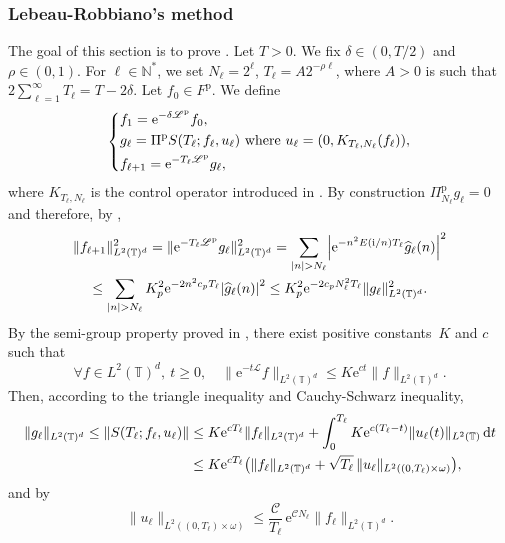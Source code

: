 \documentclass[10pt]{amsart}
\let\mathcal\mathscr
\theoremstyle{plain}
\theoremstyle{definition}
\theoremstyle{remark}
\newcommand{\diff}[1][-3]{\ensuremath{\mathop{}\mkern#1mu\mathrm{d}}}
\newcommand{\set}{\mathbb}
\newcommand{\T}{\set{T}}
\newcommand{\p}{{\mathrm p}}
\newcommand{\eu}{\mathrm e}
\newcommand{\iu}{\mathrm i}
\let\originalleft\left
\let\originalright\right
\renewcommand{\left}{\mathopen{}\mathclose\bgroup\originalleft}
\renewcommand{\right}{\aftergroup\egroup\originalright}
\newcommand{\ssqrt}[1]{\sqrt{\smash[b]{#1}}}
\begin{document}
\subsubsection{Lebeau-Robbiano's method} \label{Subsec:LR}

The goal of this section is to prove . Let $T>0$.
We fix $\delta \in (0,T/2)$ and $\rho \in (0,1)$.
For $\ell \in \set N^*$, we set $N_\ell=2^\ell$, $T_{\ell}=A2^{-\rho \ell}$, where $A>0$ is such that $2\sum_{\ell=1}^\infty T_\ell = T - 2\delta$.
Let $f_0 \in F^\p$. We define
\[
\left\lbrace\begin{aligned}
& f_1=\eu^{-\delta \mathcal{L}^\p} f_0, \\
& g_\ell = \Pi^\p S(T_\ell ; f_\ell, u_\ell) \text{ where } u_\ell = \left(0,K_{T_\ell,N_\ell}(f_\ell)\right), \\
& f_{\ell+1}=\eu^{-T_\ell \mathcal{L}^\p} g_\ell,
\end{aligned}\right.
\]
where $K_{T_\ell,N_\ell}$ is the control operator introduced in . By construction $\Pi^\p_{N_\ell} g_\ell=0$ and therefore, by ,
\begin{multline*}
\|f_{\ell+1}\|_{L^2(\T)^d}^2 = \| \eu^{-T_\ell \mathcal{L}^\p} g_\ell \|_{L^2(\T)^d}^2
= \sum_{|n|>N_\ell} \left\lvert \eu^{-n^2 E(\iu/n)T_\ell} \widehat{g}_\ell(n) \right\rvert^2 \\
\leq \sum_{|n|>N_\ell} K_p^2 \eu^{-2 n^2 c_p T_\ell} \left\lvert \widehat{g}_\ell(n) \right\rvert^2
\leq K_p^2 \eu^{-2 c_p N_\ell^2 T_\ell} \|g_\ell\|_{L^2(\T)^d}^2.
\end{multline*}
By the semi-group property proved in , there exist positive constants~$K$ and $c$ such that
\[
\forall f \in L^2(\T)^d,\ t\geq 0, \quad \| \eu^{-t\mathcal{L}} f \|_{L^2(\T)^d}\leq K \eu^{ct} \|f\|_{L^2(\T)^d}.
\]
Then, according to the triangle inequality and Cauchy-Schwarz inequality,
\begin{align*}
\|g_\ell\|_{L^2(\T)^d}
\leq \| S(T_\ell ; f_\ell, u_\ell) \|
& \leq K \eu^{cT_\ell} \|f_\ell\|_{L^2(\T)^d} + \int_0^{T_\ell} K \eu^{c(T_\ell-t)} \|u_\ell(t)\|_{L^2(\T)} \diff t \\
& \leq K \eu^{cT_\ell} \bigl(\|f_\ell\|_{L^2(\T)^d} + \ssqrt{T_\ell}\, \|u_\ell\|_{L^2((0,T_\ell)\times\omega)} \bigr),
\end{align*}
and by 
\begin{equation}\label{Control:EstimationL2}
\| u_\ell \|_{L^2((0,T_\ell)\times\omega)} \leq \frac{\mathcal{C}}{T_\ell}\, \eu^{\mathcal{C} N_\ell} \|f_\ell\|_{L^2(\T)^d}.
\end{equation}
\end{document}
